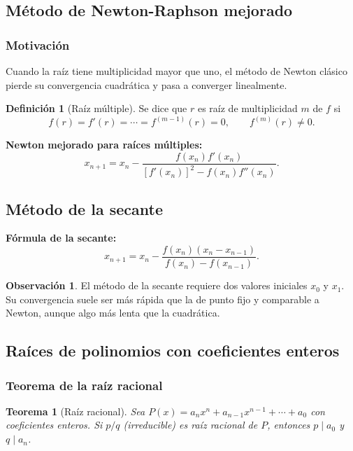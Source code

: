 \documentclass[a4paper,12pt]{article}
\theoremstyle{definition}
\newtheorem{definicion}{Definición}[section]
\newtheorem{observacion}{Observación}[section]
\theoremstyle{plain}
\newtheorem{teorema}{Teorema}[section]
\begin{document}
\subsection{Método de Newton-Raphson mejorado}

\subsubsection{Motivación}

Cuando la raíz tiene multiplicidad mayor que uno, el método de Newton clásico
pierde su convergencia cuadrática y pasa a converger linealmente.

\begin{definicion}[Raíz múltiple]
Se dice que $r$ es raíz de multiplicidad $m$ de $f$ si
\[
f(r)=f'(r)=\cdots=f^{(m-1)}(r)=0, \qquad f^{(m)}(r)\neq 0.
\]
\end{definicion}

\begin{cajaresultado}
\textbf{Newton mejorado para raíces múltiples:}
\[
x_{n+1}=x_n-\frac{f(x_n)f'(x_n)}{[f'(x_n)]^2-f(x_n)f''(x_n)}.
\]
\end{cajaresultado}

\subsection{Método de la secante}

\begin{cajaresultado}
\textbf{Fórmula de la secante:}
\[
x_{n+1} = x_n - \frac{f(x_n)(x_n-x_{n-1})}{f(x_n)-f(x_{n-1})}.
\]
\end{cajaresultado}

\begin{observacion}
El método de la secante requiere dos valores iniciales $x_0$ y $x_1$. Su
convergencia suele ser más rápida que la de punto fijo y comparable a Newton,
aunque algo más lenta que la cuadrática.
\end{observacion}

\subsection{Raíces de polinomios con coeficientes enteros}

\subsubsection{Teorema de la raíz racional}

\begin{teorema}[Raíz racional]
Sea $P(x)=a_nx^n+a_{n-1}x^{n-1}+\cdots+a_0$ con coeficientes enteros. Si
$p/q$ (irreducible) es raíz racional de $P$, entonces $p\mid a_0$ y
$q\mid a_n$.
\end{teorema}
\end{document}
